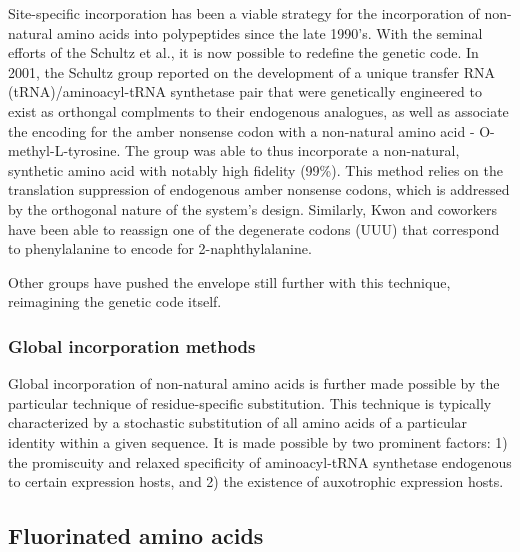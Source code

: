 
Site-specific incorporation has been a viable strategy for the incorporation of
non-natural amino acids into polypeptides since the late 1990's. With the
seminal efforts of the Schultz et al., it is now possible to redefine the
genetic code. In 2001, the Schultz group reported on the development of a unique
transfer RNA (tRNA)/aminoacyl-tRNA synthetase pair that were genetically
engineered to exist as orthongal complments to their endogenous analogues, as
well as associate the encoding for the amber nonsense codon with a non-natural
amino acid - O-methyl-L-tyrosine. The group was able to thus incorporate a
non-natural, synthetic amino acid with notably high fidelity
(99\%).\cite{Wang2001} This method relies on the translation suppression of
endogenous amber nonsense codons, which is addressed by the orthogonal nature of
the system's design. Similarly, Kwon and coworkers have been able to reassign
one of the degenerate codons (UUU) that correspond to phenylalanine to encode
for 2-naphthylalanine.\cite{Kwon2003}

Other groups have pushed the envelope still further with this technique,
reimagining the genetic code itself.

\subsubsection{Global incorporation methods} 


Global incorporation of non-natural amino acids is further made possible by the
particular technique of residue-specific substitution. This technique is
typically characterized by a stochastic substitution of all amino acids of a
particular identity within a given sequence. It is made possible by two
prominent factors: 1) the promiscuity and relaxed specificity of aminoacyl-tRNA
synthetase endogenous to certain expression hosts, and 2) the existence of
auxotrophic expression hosts.

\subsection{Fluorinated amino acids}






